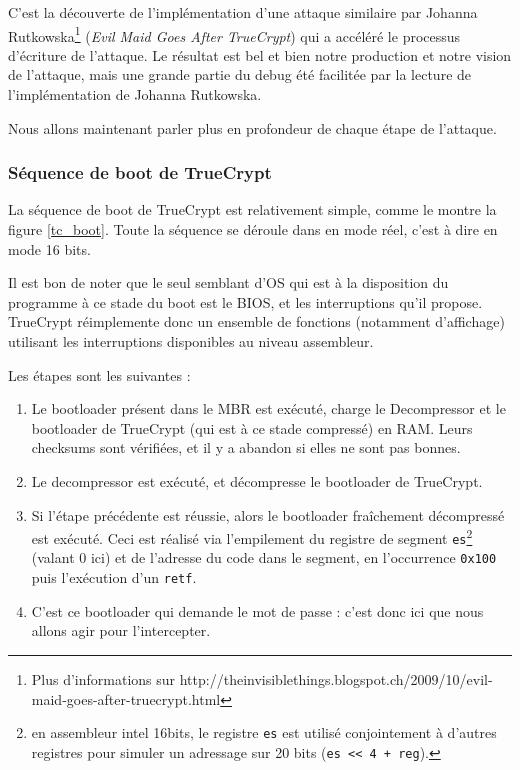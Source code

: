 \documentclass[12pt,a4paper]{article}
\begin{document}
C'est la découverte de l'implémentation d'une attaque similaire par Johanna
Rutkowska\footnote{Plus d'informations sur
http://theinvisiblethings.blogspot.ch/2009/10/evil-maid-goes-after-truecrypt.html}
(\textit{Evil Maid Goes After TrueCrypt}) qui a accéléré le processus
d'écriture de l'attaque. Le résultat est bel et bien notre production et notre
vision de l'attaque, mais une grande partie du debug été facilitée par la
lecture de l'implémentation de Johanna Rutkowska.

Nous allons maintenant parler plus en profondeur de chaque étape de l'attaque.

\subsubsection{Séquence de boot de TrueCrypt}

La séquence de boot de TrueCrypt est relativement simple, comme le montre la
figure \ref{tc_boot}. Toute la séquence se déroule dans en mode réel, c'est à dire
en mode 16 bits.

Il est bon de noter que le seul semblant d'OS qui est à la disposition du
programme à ce stade du boot est le BIOS, et les interruptions qu'il propose.
TrueCrypt réimplemente donc un ensemble de fonctions (notamment d'affichage)
utilisant les interruptions disponibles au niveau assembleur.

Les étapes sont les suivantes :
\begin{enumerate}
    \item Le bootloader présent dans le MBR est exécuté, charge le Decompressor
    et le bootloader de TrueCrypt (qui est à ce stade compressé) en RAM. Leurs
    checksums sont vérifiées, et il y a abandon si elles ne sont pas bonnes.
    \item Le decompressor est exécuté, et décompresse le bootloader de
    TrueCrypt.
    \item Si l'étape précédente est réussie, alors le bootloader fraîchement
    décompressé est exécuté. Ceci est réalisé via l'empilement du registre de
    segment \texttt{es}\footnote{en assembleur intel 16bits, le registre
    \texttt{es} est utilisé conjointement à d'autres registres pour simuler un
    adressage sur 20 bits (\texttt{es << 4 + reg}).} (valant 0 ici) et de
    l'adresse du code dans le segment, en l'occurrence \texttt{0x100} puis
    l'exécution d'un \texttt{retf}.  \item C'est ce bootloader qui demande le
    mot de passe : c'est donc ici que nous allons agir pour l'intercepter.
\end{enumerate}
\end{document}
